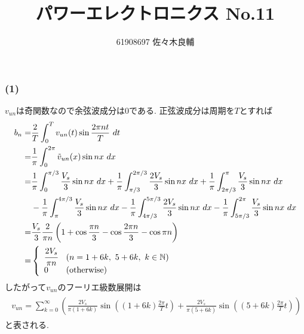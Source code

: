 \documentclass[uplatex,a4j,11pt,dvipdfmx]{jsarticle}
\begin{document}
\title{パワーエレクトロニクス No.11}
\author{61908697 佐々木良輔}
\date{}
\maketitle
\subsubsection*{(1)}
$v_{un}$は奇関数なので余弦波成分は$0$である.
正弦波成分は周期を$T$とすれば
\begin{align}
  \begin{split}
    b_n=&\frac{2}{T}\int_0^Tv_{un}(t)\sin\frac{2\pi nt}{T}\ dt\\
    =&\frac{1}{\pi}\int_0^{2\pi}\tilde{v}_{un}(x)\sin nx\ dx\\
    =&\frac{1}{\pi}\int_0^{\pi/3}\frac{V_s}{3}\sin nx\ dx+\frac{1}{\pi}\int_{\pi/3}^{2\pi/3}\frac{2V_s}{3}\sin nx\ dx
    +\frac{1}{\pi}\int_{2\pi/3}^{\pi}\frac{V_s}{3}\sin nx\ dx\\
    &-\frac{1}{\pi}\int_\pi^{4\pi/3}\frac{V_s}{3}\sin nx\ dx-\frac{1}{\pi}\int_{4\pi/3}^{5\pi/3}\frac{2V_s}{3}\sin nx\ dx
    -\frac{1}{\pi}\int_{5\pi/3}^{2\pi}\frac{V_s}{3}\sin nx\ dx\\
    =&\frac{V_s}{3}\frac{2}{\pi n}\left(1+\cos\frac{\pi n}{3}-\cos\frac{2\pi n}{3}-\cos\pi n\right)\\
    =&\left\{
    \begin{array}{ll}
      \cfrac{2V_s}{\pi n}&(n=1+6k,\ 5+6k,\ k\in\mathbb{N})\\
      0&({\rm otherwise})
    \end{array}
    \right.
  \end{split}
\end{align}
したがって$v_{un}$のフーリエ級数展開は
\begin{align}
  \begin{split}
    v_{un}=\sum_{k=0}^\infty\left(\frac{2V_s}{\pi(1+6k)}\sin\left((1+6k)\frac{2\pi}{T}t\right)+\frac{2V_s}{\pi(5+6k)}\sin\left((5+6k)\frac{2\pi}{T}t\right)\right)
  \end{split}
\end{align}
と表される.
\end{document}
